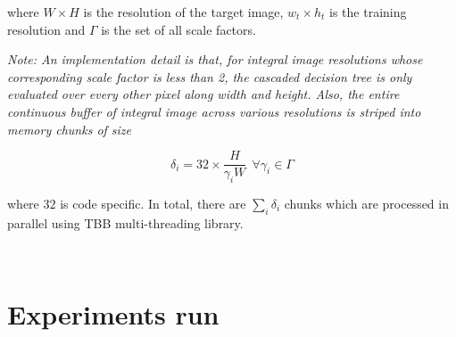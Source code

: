 where $W \times H$ is the resolution of the target image, $w_t \times h_t$ is the training resolution and $\Gamma$ is the set of all scale factors. \\

{\it Note: An implementation detail is that, for integral image resolutions whose corresponding scale factor is less than 2, the cascaded decision tree is only evaluated over every other pixel along width and height. Also, the entire continuous buffer of integral image across various resolutions is striped into memory chunks of size 

\begin{equation}
\delta_i = 32 \times \frac{H}{\gamma_i W} \  \ \forall \gamma_i \in \Gamma
\label{eq11}
\end{equation}


where $32$ is code specific. In total, there are $\sum_i \delta_i$ chunks which are processed in parallel using TBB multi-threading library.
} \\


\section{Experiments run}

